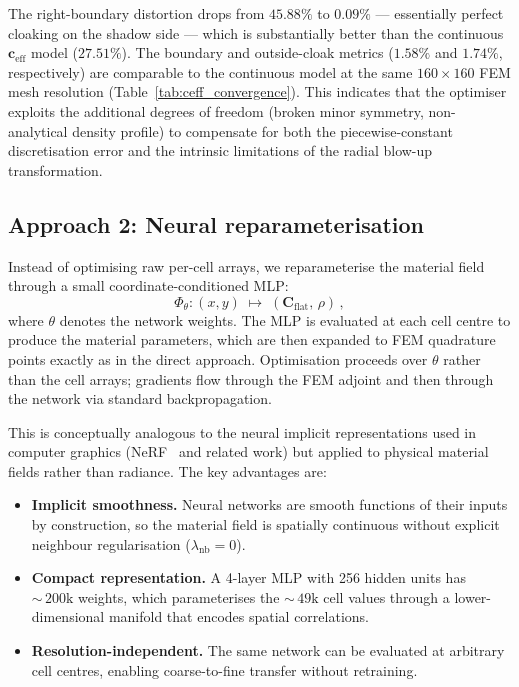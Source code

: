 \documentclass{article}
\newcommand{\mbf}[1]{\mathbf{#1}}
\newcommand{\be}{\begin{equation}}
\newcommand{\ee}{\end{equation}}
\begin{document}
The right-boundary distortion drops from $45.88\%$ to $0.09\%$
--- essentially perfect cloaking on the shadow side --- which is
substantially better than the continuous $\mbf{c}_{\mathrm{eff}}$ model
($27.51\%$).
The boundary and outside-cloak metrics ($1.58\%$ and $1.74\%$,
respectively) are comparable to the continuous model at the same
$160\times160$ FEM mesh resolution (Table~\ref{tab:ceff_convergence}).
This indicates that the optimiser exploits the additional degrees of
freedom (broken minor symmetry, non-analytical density profile) to
compensate for both the piecewise-constant discretisation error and
the intrinsic limitations of the radial blow-up transformation.

\subsection{Approach 2: Neural reparameterisation}
\label{sec:neural_reparam}

Instead of optimising raw per-cell arrays, we reparameterise the material
field through a small coordinate-conditioned MLP:
\be
  \Phi_\theta \colon (x, y) \;\mapsto\;
  (\mbf{C}_{\mathrm{flat}},\, \rho)\,,
\ee
where $\theta$ denotes the network weights.
The MLP is evaluated at each cell centre to produce the material
parameters, which are then expanded to FEM quadrature points exactly
as in the direct approach.
Optimisation proceeds over $\theta$ rather than the cell arrays;
gradients flow through the FEM adjoint and then through the network
via standard backpropagation.

This is conceptually analogous to the neural implicit representations
used in computer graphics (NeRF~\cite{mildenhall2020nerf} and
related work) but applied to physical material fields rather than
radiance.
The key advantages are:
\begin{itemize}
\item \textbf{Implicit smoothness.}  Neural networks are smooth
  functions of their inputs by construction, so the material field
  is spatially continuous without explicit neighbour regularisation
  ($\lambda_{\mathrm{nb}} = 0$).
\item \textbf{Compact representation.}  A 4-layer MLP with 256 hidden
  units has ${\sim}\,200\text{k}$ weights, which parameterises the
  ${\sim}\,49\text{k}$ cell values through a lower-dimensional manifold
  that encodes spatial correlations.
\item \textbf{Resolution-independent.}  The same network can be
  evaluated at arbitrary cell centres, enabling coarse-to-fine
  transfer without retraining.
\end{itemize}
\end{document}
